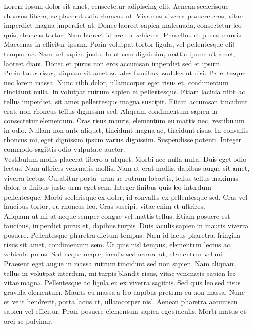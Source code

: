 Lorem ipsum dolor sit amet, consectetur adipiscing elit. Aenean scelerisque rhoncus libero, ac placerat odio rhoncus ut. Vivamus viverra posuere eros, vitae imperdiet magna imperdiet at. Donec laoreet sapien malesuada, consectetur leo quis, rhoncus tortor. Nam laoreet id arcu a vehicula. Phasellus ut purus mauris. Maecenas in efficitur ipsum. Proin volutpat tortor ligula, vel pellentesque elit tempus ac. Nam vel sapien justo. In at sem dignissim, mattis ipsum sit amet, laoreet diam. Donec et purus non eros accumsan imperdiet sed et ipsum.\\

Proin lacus risus, aliquam sit amet sodales faucibus, sodales ut nisi. Pellentesque nec lorem massa. Nunc nibh dolor, ullamcorper eget risus et, condimentum tincidunt nulla. In volutpat rutrum sapien et pellentesque. Etiam lacinia nibh ac tellus imperdiet, sit amet pellentesque magna suscipit. Etiam accumsan tincidunt erat, non rhoncus tellus dignissim sed. Aliquam condimentum sapien in consectetur elementum. Cras risus mauris, elementum eu mattis nec, vestibulum in odio. Nullam non ante aliquet, tincidunt magna ac, tincidunt risus. In convallis rhoncus mi, eget dignissim ipsum varius dignissim. Suspendisse potenti. Integer commodo sagittis odio vulputate auctor.\\

Vestibulum mollis placerat libero a aliquet. Morbi nec nulla nulla. Duis eget odio lectus. Nam ultrices venenatis mollis. Nam at erat mollis, dapibus augue sit amet, viverra lectus. Curabitur porta, urna ac rutrum lobortis, tellus tellus maximus dolor, a finibus justo urna eget sem. Integer finibus quis leo interdum pellentesque. Morbi scelerisque ex dolor, id convallis ex pellentesque sed. Cras vel faucibus tortor, eu rhoncus leo. Cras suscipit vitae enim et ultrices.\\

Aliquam ut mi at neque semper congue vel mattis tellus. Etiam posuere est faucibus, imperdiet purus et, dapibus turpis. Duis iaculis sapien in mauris viverra posuere. Pellentesque pharetra dictum tempus. Nam id lacus pharetra, fringilla risus sit amet, condimentum sem. Ut quis nisl tempus, elementum lectus ac, vehicula purus. Sed neque neque, iaculis sed ornare at, elementum vel mi. Praesent eget augue in massa rutrum tincidunt sed non sapien. Nam aliquam, tellus in volutpat interdum, mi turpis blandit risus, vitae venenatis sapien leo vitae magna. Pellentesque ac ligula eu ex viverra sagittis. Sed quis leo sed risus gravida elementum. Mauris eu massa a leo dapibus pretium eu non massa. Nunc et velit hendrerit, porta lacus ut, ullamcorper nisl. Aenean pharetra accumsan sapien vel efficitur. Proin posuere elementum sapien eget iaculis. Morbi mattis et orci ac pulvinar.\\

